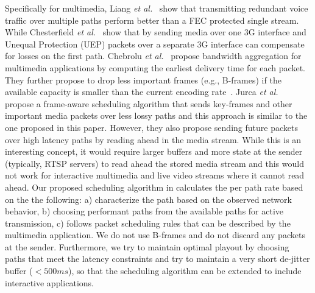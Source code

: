 Specifically for multimedia, Liang \emph{et al.}~\cite{Liang01} show that
transmitting redundant voice traffic over multiple paths perform better than a
FEC protected single stream. While Chesterfield \emph{et al.}~\cite{1498479}
show that by sending media over one 3G interface and Unequal Protection (UEP)
packets over a separate 3G interface can compensate for losses on the first
path. Chebrolu \emph{et al.}~\cite{1599407} propose bandwidth aggregation for
multimedia applications by computing the earliest delivery time for each
packet. They further propose to drop less important frames (e.g., B-frames) if
the available capacity is smaller than the current encoding
rate~\cite{1313320}. Jurca \emph{et al.}~\cite{4130370:jurca} propose a
frame-aware scheduling algorithm that sends key-frames and other important
media packets over less lossy paths and this approach is similar to the one
proposed in this paper. However, they also propose sending future packets over
high latency paths by reading ahead in the media stream. While this is an
interesting concept, it would require larger buffers and more state at the
sender (typically, RTSP servers) to read ahead the stored media stream and
this would not work for interactive multimedia and live video streams where it
cannot read ahead. Our proposed scheduling algorithm in 
calculates the per path rate based on the the following: a) characterize the
path based on the observed network behavior, b) choosing performant paths from
the available paths for active transmission, c) follows packet scheduling
rules that can be described by the multimedia application. We do not use
B-frames and do not discard any packets at the sender. Furthermore, we try to
maintain optimal playout by choosing paths that meet the latency constraints
and try to maintain a very short de-jitter buffer ($<500ms$), so that the
scheduling algorithm can be extended to include interactive applications.


